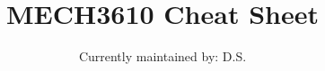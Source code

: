 \documentclass[10pt,twocolumn]{article}
\begin{document}
\title{\Huge \bf MECH3610 Cheat Sheet}
\author{\large Currently maintained by: D.S.}

\maketitle





%
%
%
%
%
%
%

\printbibliography
\end{document}
